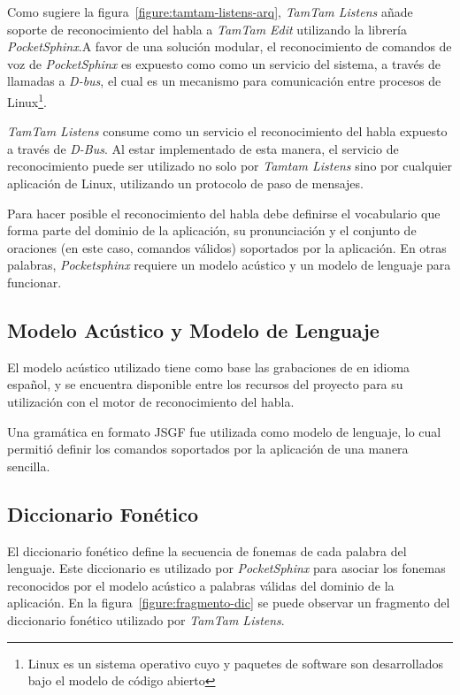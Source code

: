 Como sugiere la figura~\ref{figure:tamtam-listens-arq}, \emph{TamTam Listens} a\~nade soporte de reconocimiento
del habla a \emph{TamTam Edit} utilizando la librer\'ia \emph{PocketSphinx}.A favor de una soluci\'on modular,
el reconocimiento de comandos de voz de \emph{PocketSphinx} es expuesto como 
como un  servicio del sistema, a trav\'es de llamadas a \emph{D-bus}\cite{Dbus2013}, el cual es
un mecanismo para comunicaci\'on entre procesos de Linux\footnote{Linux es un sistema operativo cuyo  y paquetes
    de software son desarrollados bajo el modelo de c\'odigo abierto\cite{LinuxGuideCert}}.

\emph{TamTam Listens} consume como un servicio el reconocimiento del habla expuesto a trav\'es de \emph{D-Bus}. Al estar implementado de esta manera, el
servicio de reconocimiento puede ser utilizado no solo por \emph{Tamtam Listens} sino por cualquier aplicaci\'on 
de Linux, utilizando un protocolo de paso de mensajes. 

Para hacer posible el reconocimiento del habla debe definirse el vocabulario que forma parte del dominio de 
la aplicaci\'on, su pronunciaci\'on y el conjunto de oraciones (en este caso, comandos v\'alidos) soportados por la aplicaci\'on.
En otras palabras, \emph{Pocketsphinx} requiere un modelo ac\'ustico y un modelo de lenguaje para funcionar.

\subsection{Modelo Ac\'ustico y Modelo de Lenguaje}

El modelo ac\'ustico utilizado tiene como base las grabaciones de  en idioma espa\~nol,
y se encuentra disponible entre los recursos del proyecto  para su utilizaci\'on
con el motor de reconocimiento del habla.

Una gram\'atica en formato JSGF \cite{JSGF2000} fue utilizada como modelo de lenguaje, lo cual permiti\'o
definir los comandos soportados por la aplicaci\'on de una manera sencilla.

\subsection{Diccionario Fon\'etico}

El diccionario fon\'etico define la secuencia de fonemas de cada palabra del lenguaje.
Este diccionario es utilizado por \emph{PocketSphinx} para asociar los fonemas reconocidos por
el modelo ac\'ustico a palabras v\'alidas del dominio de la aplicaci\'on.
En la figura~\ref{figure:fragmento-dic} se puede observar un fragmento del diccionario fon\'etico
utilizado por \emph{TamTam Listens}.


